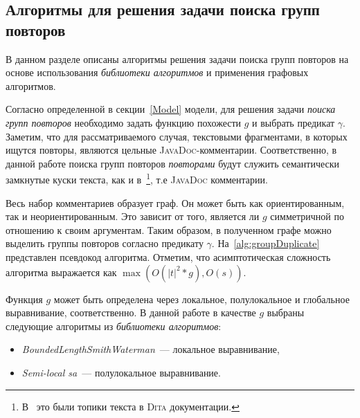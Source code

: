 



\subsection{Алгоритмы для решения задачи поиска групп повторов}\label{grouppa}
В данном разделе описаны алгоритмы решения задачи поиска групп повторов на основе использования \emph{библиотеки алгоритмов} и применения графовых алгоритмов.

Согласно определенной в секции~\ref{Model} модели, для решения задачи \emph{поиска групп повторов} необходимо
задать функцию похожести $g$ и выбрать предикат $\gamma$.
Заметим, что для рассматриваемого случая, текстовыми фрагментами, в которых ищутся повторы, являются цельные \textsc{JavaDoc}-комментарии.
Соответственно, в данной работе  поиска групп повторов \emph{повторами} будут служить семантически замкнутые куски текста, как и в~\cite{soto2015similarity}\footnote{В~\cite{soto2015similarity} это были топики текста в \textsc{Dita} документации.}, т.е \textsc{JavaDoc} комментарии.

Весь набор комментариев образует граф.
Он может быть как ориентированным, так и неориентированным.
Это зависит  от того, является ли $g$ симметричной по отношению к своим аргументам.
Таким образом, в полученном графе можно выделить группы повторов согласно предикату $\gamma$.
На~\ref{alg:groupDuplicate} представлен псевдокод алгоритма.
Отметим, что асимптотическая сложность алгоритма выражается как $\max (O(|t|^2*g), O(s))$.

Функция $g$ может быть определена через локальное, полулокальное и глобальное выравнивание, соответственно.
В данной работе в качестве $g$ выбраны следующие алгоритмы из \emph{библиотеки алгоритмов}:
\begin{itemize}
    \item \emph{BoundedLengthSmithWaterman}~--- локальное выравнивание,
    \item \emph{Semi-local sa}~--- полулокальное выравнивание.
\end{itemize}

